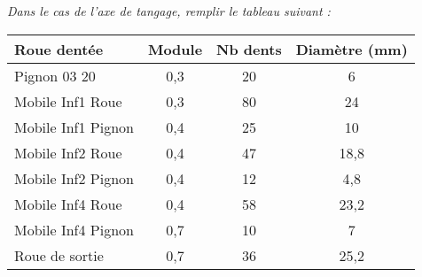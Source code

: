 \documentclass[10pt,fleqn]{article} %
\begin{document}
\begin{multicols}{2}
\ifprof
\subparagraph{}
\textit{Dans le cas de l'axe de tangage, remplir le tableau suivant :}
\begin{corrige}
\begin{center}
\begin{tabular}{|l|c|c|c|}
\hline
Roue dentée & Module & Nb dents & Diamètre (mm)\\
\hline
Pignon 03 20 & 0,3 &20        & 6		\\ \hline
Mobile Inf1 Roue & 0,3 & 80  & 24 	\\ \hline 
Mobile Inf1 Pignon & 0,4 & 25 & 10	\\ \hline
Mobile Inf2 Roue & 0,4 & 47   & 18,8	\\ \hline
Mobile Inf2 Pignon & 0,4 & 12 & 4,8	\\ \hline
Mobile Inf4 Roue & 0,4 & 58   & 23,2	\\ \hline
Mobile Inf4 Pignon & 0,7 & 10 & 7	\\ \hline
Roue de sortie & 0,7 & 36      & 25,2 \\ \hline
\end{tabular}
\end{center}
\end{corrige}


\end{multicols}
\end{document}
